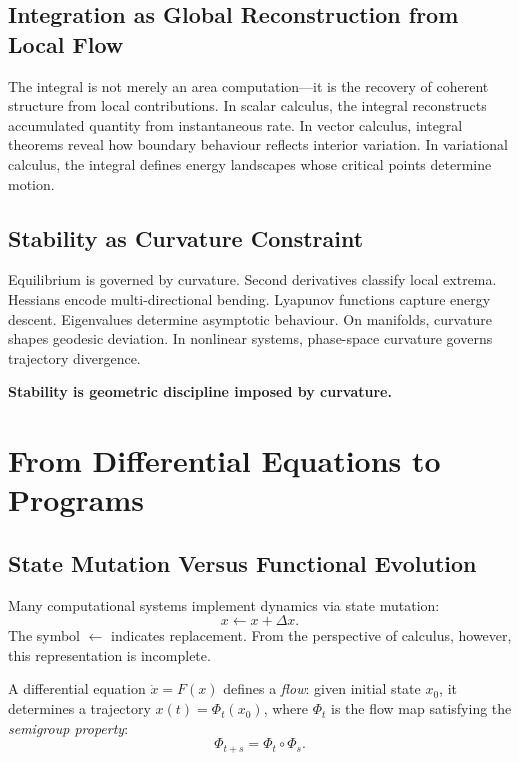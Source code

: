 \documentclass[12pt,openany]{book}
\begin{document}
\section{Integration as Global Reconstruction from Local Flow}

The integral is not merely an area computation—it is the recovery of coherent
structure from local contributions. In scalar calculus, the integral
reconstructs accumulated quantity from instantaneous rate. In vector calculus,
integral theorems reveal how boundary behaviour reflects interior variation. In
variational calculus, the integral defines energy landscapes whose critical
points determine motion.

\section{Stability as Curvature Constraint}

Equilibrium is governed by curvature. Second derivatives classify local
extrema. Hessians encode multi-directional bending. Lyapunov functions capture
energy descent. Eigenvalues determine asymptotic behaviour. On manifolds,
curvature shapes geodesic deviation. In nonlinear systems, phase-space
curvature governs trajectory divergence.

\textbf{Stability is geometric discipline imposed by curvature.}

\chapter{From Differential Equations to Programs}
\label{ch:programs}

\section{State Mutation Versus Functional Evolution}

Many computational systems implement dynamics via state mutation:
\[
  x \leftarrow x + \Delta x.
\]
The symbol $\leftarrow$ indicates replacement. From the perspective of calculus,
however, this representation is incomplete.

A differential equation $\dot x = F(x)$ defines a \emph{flow}: given initial
state $x_0$, it determines a trajectory $x(t)=\Phi_t(x_0)$, where $\Phi_t$ is
the flow map satisfying the \emph{semigroup property}:
\[
  \Phi_{t+s} = \Phi_t\circ\Phi_s.
\]
\end{document}
